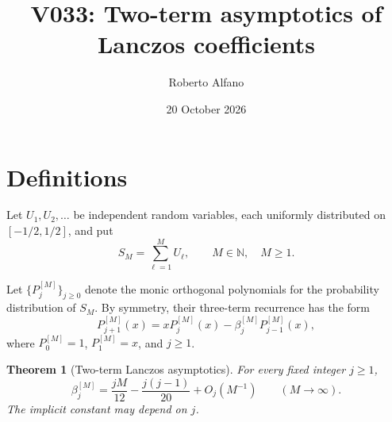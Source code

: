 \documentclass[10pt]{amsart}
\title{V033: Two-term asymptotics of Lanczos coefficients}
\author{Roberto Alfano}
\date{20 October 2026}
\newtheorem{theorem}{Theorem}
\begin{document}
\maketitle

\section*{Definitions}

Let $U_1,U_2,\ldots$ be independent random variables,
each uniformly distributed on $[-1/2,1/2]$, and put
\[
S_M=\sum_{\ell=1}^{M}U_\ell,
\qquad M\in\mathbb{N},\quad M\geq1.
\]

Let $\{P_j^{[M]}\}_{j\geq0}$ denote the monic orthogonal
polynomials for the probability distribution of $S_M$.
By symmetry, their three-term recurrence has the form
\[
P_{j+1}^{[M]}(x)
 =xP_j^{[M]}(x)
 -\beta_j^{[M]}P_{j-1}^{[M]}(x),
\]
where $P_0^{[M]}=1$, $P_1^{[M]}=x$, and $j\geq1$.

\begin{theorem}[Two-term Lanczos asymptotics]
For every fixed integer $j\geq1$,
\[
\boxed{
\beta_j^{[M]}
 =\frac{jM}{12}
 -\frac{j(j-1)}{20}
 +O_j(M^{-1})
}
\qquad (M\longrightarrow\infty).
\]
The implicit constant may depend on $j$.
\end{theorem}
\end{document}
